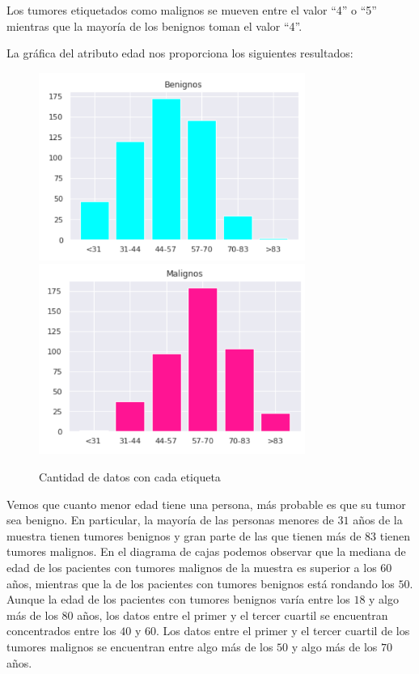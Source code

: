 \documentclass[a4]{article}
\begin{document}
Los tumores etiquetados como malignos se mueven entre el valor ``4'' o ``5'' mientras que la mayoría de los benignos toman el valor ``4''.

La gráfica del atributo edad nos proporciona los siguientes resultados:

\begin{figure}[H]
  \centering
  \caption{Cantidad de datos con cada etiqueta}
  \includegraphics[width=87mm]{imagenes/edad_ben}
  \includegraphics[width=87mm]{imagenes/edad_mal}
\end{figure}

Vemos que cuanto menor edad tiene una persona, más probable es que su tumor sea benigno. En particular, la mayoría de las personas menores de $31$ años de la muestra tienen tumores benignos y gran parte de las que tienen más de $83$ tienen tumores malignos. En el diagrama de cajas podemos observar que la mediana de edad de los pacientes con tumores malignos de la muestra es superior a los $60$ años, mientras que la de los pacientes con tumores benignos está rondando los $50$. Aunque la edad de los pacientes con tumores benignos varía entre los $18$ y algo más de los $80$ años, los datos entre el primer y el tercer cuartil se encuentran concentrados entre los $40$ y $60$. Los datos entre el primer y el tercer cuartil de los tumores malignos se encuentran entre algo más de los $50$ y algo más de los $70$ años.
\end{document}
